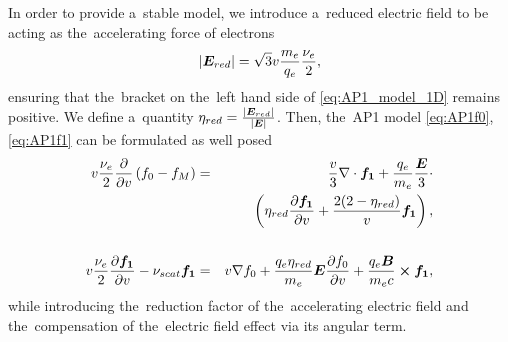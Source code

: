 In order to provide a~stable model, we introduce a~reduced electric field
to be acting as the~accelerating force of electrons
\begin{equation}
  |\boldsymbol{E}_{red}| = \sqrt{3} v\frac{m_e}{q_e}\frac{\nu_{e}}{2} ,
  \label{eq:Elimit}
\end{equation}
ensuring that the~bracket on the~left hand side of \eqref{eq:AP1_model_1D}
remains positive. We define a~quantity $\eta_{red} = \frac{|\boldsymbol{E}_{red}|}{|\boldsymbol{E}|}$.
Then, the~AP1 model \eqref{eq:AP1f0}, \eqref{eq:AP1f1} can be formulated 
as well posed 
\begin{eqnarray}
  v\frac{\nu_{e}}{2}\frac{\partial{}}{\partial{v}}\left(f_0 - f_M \right) &=&
  \frac{v}{3}\nabla\cdot{\boldsymbol{f_1}} + \frac{q_e}{m_e}\frac{\boldsymbol{E}}{3}\cdot
  \nonumber \\
  &&\left(
  \eta_{red}\frac{\partial{{\boldsymbol{f_1}}}}{\partial{v}} + \frac{2(2-\eta_{red})}{v}{\boldsymbol{f_1}}\right) , 
  \nonumber \\
  \label{eq:AP1f0_app}\\
  v\frac{\nu_{e}}{2}\frac{\partial{{\boldsymbol{f_1}}}}{\partial{v}}
  - \nu_{scat}{\boldsymbol{f_1}} &=& 
  v\nabla f_0 + 
  \frac{q_e\eta_{red}}{m_e}\boldsymbol{E}\frac{\partial{f_0}}{\partial{v}} 
  +\frac{q_e\boldsymbol{B}}{m_e c}\boldsymbol{\times} {\boldsymbol{f_1}}
  ,
  \nonumber \\
  \label{eq:AP1f1_app}
\end{eqnarray}
while introducing the~reduction factor of the~accelerating electric field
and the~compensation of the~electric field effect via its angular term.  

